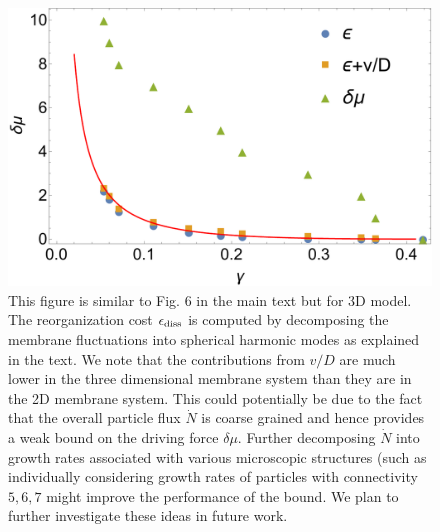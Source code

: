 \documentclass[amsmath,preprintnumbers,10pt,nofootinbib,prl,twocolumn]{revtex4-1}
\begin{document}
\begin{figure}
\includegraphics[width=1\linewidth,angle=0]{Fig12.pdf}
\caption{ This figure is similar to Fig. 6 in the main text but for 3D model. The reorganization cost $\epsilon_{\rm diss}$ is computed by decomposing the membrane fluctuations into spherical harmonic modes as explained in the text. We note that the contributions from $v/D$ are much lower in the three dimensional membrane system than they are in the 2D membrane system. This could potentially be due to the fact that the overall particle flux $\dot{N}$ is coarse grained and hence provides a weak bound on the driving force $\delta \mu$. Further decomposing $\dot{N}$ into growth rates associated with various microscopic structures (such as individually considering growth rates of particles with connectivity $5, 6, 7$ might improve the performance of the bound. We plan to further investigate these ideas in future work.}
\label{fig:boundsof3Dmembrane}
\end{figure}

\end{document}
